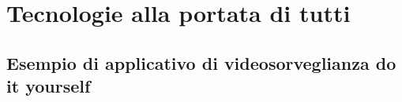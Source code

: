 \chapter{Tecnologie alla portata di tutti}
\section{Esempio di applicativo di videosorveglianza do it yourself}